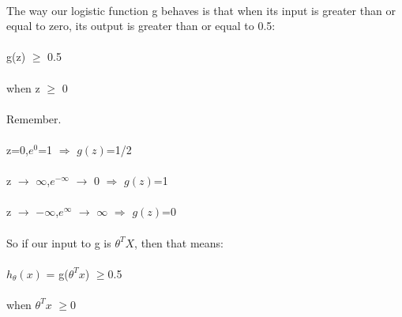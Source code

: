\documentclass[UTF8]{ctexart}
\begin{document}
\paragraph{}
The way our logistic function g behaves is that when its input is greater than or equal to zero, its output is greater than or equal to 0.5:
\begin{algorithm}
\paragraph{}
g(z) $\geq$ 0.5
\paragraph{}
when z $\geq$ 0
\end{algorithm}
\paragraph{}
Remember.
\paragraph{}
\begin{algorithm}
\paragraph{}
z=0,$e^{0}$=1 $\Rightarrow$ $g(z)$=1/2
\paragraph{}
z $\rightarrow$ $\infty$,$e^{-\infty}$ $\rightarrow$ 0 $\Rightarrow$ $g(z)$=1 
\paragraph{}
z $\rightarrow$ $-\infty$,$e^{\infty}$ $\rightarrow$ $\infty$ $\Rightarrow$ $g(z)$=0
\end{algorithm}
\paragraph{}
So if our input to g is $\theta^{T}X$, then that means:
\paragraph{}
\begin{algorithm}
\paragraph{}
$h_{\theta}(x)$ = g($\theta^{T}x$) $\geq$0.5
\paragraph{}
when $\theta^{T}x$ $\geq$0
\end{algorithm}
\newpage
\end{document}
